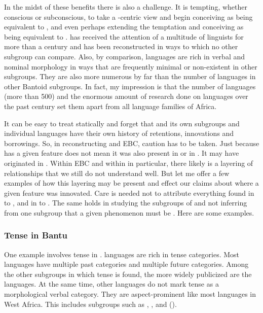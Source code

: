 \documentclass[output=paper]{langsci/langscibook}
\begin{document}
  
In the midst of these benefits there is also a challenge. It is tempting, whether conscious or subconscious, to take a -centric view and begin conceiving  as being equivalent to , and even perhaps extending the temptation and conceiving  as being equivalent to .  has received the attention of a multitude of linguists for more than a century and  has been reconstructed in ways to which no other  subgroup can compare. Also, by comparison,  languages are rich in verbal and nominal morphology in ways that are frequently minimal or non-existent in other  subgroups. They are also more numerous by far than the number of languages in other Bantoid subgroups. In fact, my impression is that the number of  languages (more than 500) and the enormous amount of research done on  languages over the past century set them apart from all language families of Africa. 

It can be easy to treat  statically and forget that  and its own subgroups and individual languages have their own history of retentions, innovations and borrowings. So, in reconstructing  and EBC, caution has to be taken. Just because  has a given feature does not mean it was also present in  or in . It may have originated in . Within EBC and within  in particular, there likely is a layering of relationships that we still do not understand well. But let me offer a few examples of how this layering may be present and effect our claims about where a given feature was innovated. Care is needed not to attribute everything found in  to , and in  to . The same holds in studying the subgroups of  and not inferring from one subgroup that a given phenomenon must be .  Here are some examples.

\subsubsection{Tense in Bantu}

One example involves tense in .  languages are rich in tense categories. Most  languages have multiple past categories and multiple future categories. Among the other  subgroups in which tense is found, the more widely publicized are the  languages. At the same time, other  languages do not mark tense as a morphological verbal category. They are aspect-prominent like most languages in West Africa. This includes  subgroups such as , , and  ().  
\end{document}
